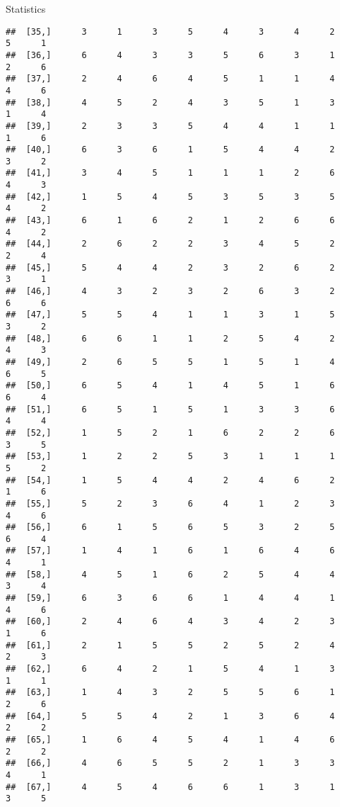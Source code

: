 \documentclass[
  ignorenonframetext,
]{beamer}
\begin{document}
\begin{frame}[fragile]{Statistics}
\begin{verbatim}
##  [35,]      3      1      3      5      4      3      4      2      5      1
##  [36,]      6      4      3      3      5      6      3      1      2      6
##  [37,]      2      4      6      4      5      1      1      4      4      6
##  [38,]      4      5      2      4      3      5      1      3      1      4
##  [39,]      2      3      3      5      4      4      1      1      1      6
##  [40,]      6      3      6      1      5      4      4      2      3      2
##  [41,]      3      4      5      1      1      1      2      6      4      3
##  [42,]      1      5      4      5      3      5      3      5      4      2
##  [43,]      6      1      6      2      1      2      6      6      4      2
##  [44,]      2      6      2      2      3      4      5      2      2      4
##  [45,]      5      4      4      2      3      2      6      2      3      1
##  [46,]      4      3      2      3      2      6      3      2      6      6
##  [47,]      5      5      4      1      1      3      1      5      3      2
##  [48,]      6      6      1      1      2      5      4      2      4      3
##  [49,]      2      6      5      5      1      5      1      4      6      5
##  [50,]      6      5      4      1      4      5      1      6      6      4
##  [51,]      6      5      1      5      1      3      3      6      4      4
##  [52,]      1      5      2      1      6      2      2      6      3      5
##  [53,]      1      2      2      5      3      1      1      1      5      2
##  [54,]      1      5      4      4      2      4      6      2      1      6
##  [55,]      5      2      3      6      4      1      2      3      4      6
##  [56,]      6      1      5      6      5      3      2      5      6      4
##  [57,]      1      4      1      6      1      6      4      6      4      1
##  [58,]      4      5      1      6      2      5      4      4      3      4
##  [59,]      6      3      6      6      1      4      4      1      4      6
##  [60,]      2      4      6      4      3      4      2      3      1      6
##  [61,]      2      1      5      5      2      5      2      4      2      3
##  [62,]      6      4      2      1      5      4      1      3      1      1
##  [63,]      1      4      3      2      5      5      6      1      2      6
##  [64,]      5      5      4      2      1      3      6      4      2      2
##  [65,]      1      6      4      5      4      1      4      6      2      2
##  [66,]      4      6      5      5      2      1      3      3      4      1
##  [67,]      4      5      4      6      6      1      3      1      3      5

\end{verbatim}
\end{frame}
\end{document}
